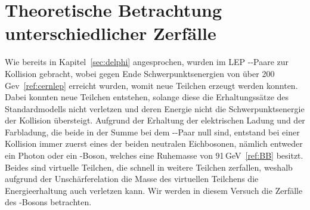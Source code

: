 \documentclass[a4paper,ngerman]{scrartcl}
\begin{document}
\section{Theoretische Betrachtung unterschiedlicher Zerfälle}
\label{sec:zerfaelle}

Wie bereits in Kapitel~\ref{sec:delphi} angesprochen, wurden im LEP \Pelectron-\APelectron-Paare zur Kollision gebracht, wobei gegen Ende Schwerpunktsenergien von über 200\,Gev~\ref{ref:cernlep} erreicht wurden,
womit neue Teilchen erzeugt werden konnten.
Dabei konnten neue Teilchen entstehen, 
solange diese die Erhaltungssätze des Standardmodells nicht verletzen 
und deren Energie nicht die Schwerpunktsenergie der Kollision übersteigt.
Aufgrund der Erhaltung der elektrischen Ladung und der Farbladung, 
die beide in der Summe bei dem \Pelectron-\APelectron-Paar null sind,
entstand bei einer Kollision immer zuerst eines der beiden neutralen Eichbosonen,
nämlich entweder ein Photon oder ein \PZzero-Boson,
welches eine Ruhemasse von 91\,GeV~\ref{ref:BB} besitzt.
Beides sind virtuelle Teilchen, die schnell in weitere Teilchen zerfallen,
weshalb aufgrund der Unschärferelation die Masse des virtuellen
Teilchens die Energieerhaltung auch verletzen kann.
Wir werden in diesem Versuch die Zerfälle des \PZzero-Bosons betrachten.\\
\end{document}
